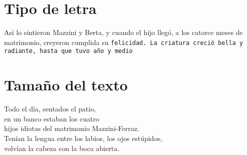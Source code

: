 \documentclass[12pt,latterpaper]{article}
\begin{document}
\section{Tipo de letra}

\sf Así lo sintieron Mazzini y Berta, y cuando el hijo llegó,
\rm a los catorce meses de matrimonio, creyeron cumplida su
\tt felicidad. La criatura creció bella y radiante, hasta que tuvo año
y medio


\section{Tamaño del texto}

\tiny Todo el día, sentados el patio,\\
\small en un banco estaban los cuatro\\
\normalsize hijos idiotas del matrimonio Mazzini-Ferraz.\\
\Large Tenían la lengua entre los labios, los ojos estúpidos,\\
\huge volvían la cabeza con la boca abierta.
\end{document}
